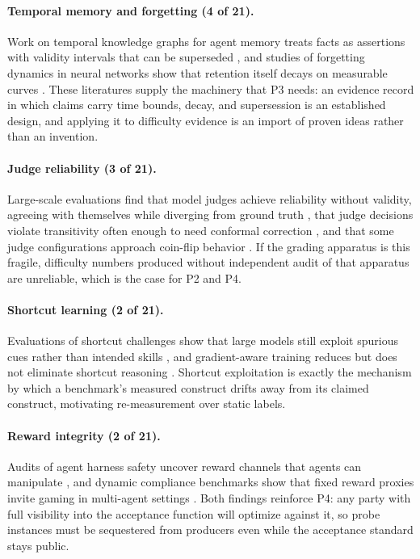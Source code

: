 \documentclass[11pt]{article}
\begin{document}
\paragraph{Temporal memory and forgetting (4 of 21).}
Work on temporal knowledge graphs for agent memory treats facts as assertions with validity intervals that can be superseded \citep{rasmussen2025zep, li2026phase, lee2026adatkg}, and studies of forgetting dynamics in neural networks show that retention itself decays on measurable curves \citep{kline2025forgetting}. These literatures supply the machinery that P3 needs: an evidence record in which claims carry time bounds, decay, and supersession is an established design, and applying it to difficulty evidence is an import of proven ideas rather than an invention.

\paragraph{Judge reliability (3 of 21).}
Large-scale evaluations find that model judges achieve reliability without validity, agreeing with themselves while diverging from ground truth \citep{norman2026reliability}, that judge decisions violate transitivity often enough to need conformal correction \citep{gupta2026conformal}, and that some judge configurations approach coin-flip behavior \citep{yagubyan2026coinflip}. If the grading apparatus is this fragile, difficulty numbers produced without independent audit of that apparatus are unreliable, which is the case for P2 and P4.

\paragraph{Shortcut learning (2 of 21).}
Evaluations of shortcut challenges show that large models still exploit spurious cues rather than intended skills \citep{yuan2024shortcut}, and gradient-aware training reduces but does not eliminate shortcut reasoning \citep{cao2026gradient}. Shortcut exploitation is exactly the mechanism by which a benchmark's measured construct drifts away from its claimed construct, motivating re-measurement over static labels.

\paragraph{Reward integrity (2 of 21).}
Audits of agent harness safety uncover reward channels that agents can manipulate \citep{liu2026harness}, and dynamic compliance benchmarks show that fixed reward proxies invite gaming in multi-agent settings \citep{zhao2026goodhart}. Both findings reinforce P4: any party with full visibility into the acceptance function will optimize against it, so probe instances must be sequestered from producers even while the acceptance standard stays public.
\end{document}
